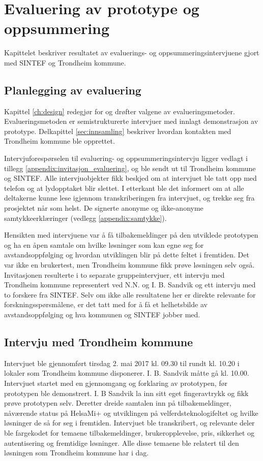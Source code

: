 \chapter{Evaluering av prototype og oppsummering}
\label{ch:evaluation1}
Kapittelet beskriver resultatet av evaluerings- og oppsummeringsintervjuene gjort med SINTEF og Trondheim kommune.

\section{Planlegging av evaluering}
Kapittel \ref{ch:design} redegjør for og drøfter valgene av evalueringsmetoder.
Evalueringsmetoden er semistrukturerte intervjuer med innlagt demonstrasjon av prototype. Delkapittel \ref{sec:innsamling}
beskriver hvordan kontakten med Trondheim kommune ble opprettet.

Intervjuforespørselen til evaluering- og oppsummeringsintervju ligger vedlagt i tillegg \ref{appendix:invitasjon_evaluering},
og ble sendt ut til Trondheim kommune og SINTEF. Alle intervjuobjekter fikk beskjed
om at intervjuet ble tatt opp med telefon og at lydopptaket blir slettet. I etterkant ble det informert om at alle deltakerne
kunne lese igjennom transkriberingen fra intervjuet, og trekke seg fra prosjektet når som helst. De signerte anonyme og ikke-anonyme
samtykkeerklæringer (vedlegg \ref{appendix:samtykke}).

Hensikten med intervjuene var å få tilbakemeldinger
på den utviklede prototypen og ha en åpen samtale om hvilke løsninger som kan egne seg for avstandsoppfølging og hvordan utviklingen blir
på dette feltet i fremtiden. Det var ikke en brukertest, men Trondheim kommune fikk prøve løsningen selv også.
Invitasjonen resulterte i to separate gruppeintervjuer, ett intervju med Trondheim kommune representert ved
N.N. og I. B. Sandvik og ett intervju med to forskere fra SINTEF. Selv om ikke alle resultatene her er direkte
relevante for forskningsspørsmålene, er det tatt med for å få et helhetsbilde av avstandsoppfølging og hva kommunen
og SINTEF jobber med.

\section{Intervju med Trondheim
kommune}\label{intervju-med-trondheim-kommune}
Intervjuet ble gjennomført tirsdag 2. mai 2017 kl. 09.30 til rundt kl. 10.20 i lokaler
som Trondheim kommune disponerer. I. B. Sandvik måtte gå kl. 10.00. Intervjuet startet med en gjennomgang og forklaring av prototypen, før prototypen
ble demonstrert. I. B Sandvik la inn sitt eget fingeravtrykk og fikk prøve prototypen selv. Deretter dreide samtalen inn på tilbakemeldinger,
nåværende status på HelsaMi+ og utviklingen på velferdsteknologifeltet og hvilke løsninger de så for seg i fremtiden. Intervjuet ble transkribert,
og relevante deler ble fargekodet for temaene tilbakemeldinger, brukeropplevelse, pris, sikkerhet og autentisering og fremtidige løsninger.
Alle disse temaene ble relatert til den løsningen som Trondheim kommune har i dag.

